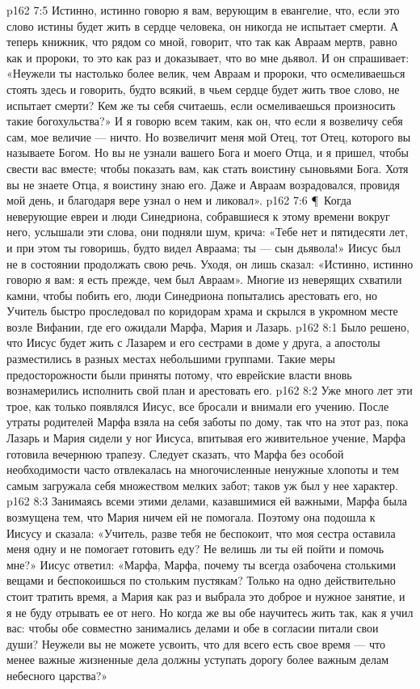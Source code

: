 \vs p162 7:5 Истинно, истинно говорю я вам, верующим в евангелие, что, если это слово истины будет жить в сердце человека, он никогда не испытает смерти. А теперь книжник, что рядом со мной, говорит, что так как Авраам мертв, равно как и пророки, то это как раз и доказывает, что во мне дьявол. И он спрашивает: «Неужели ты настолько более велик, чем Авраам и пророки, что осмеливаешься стоять здесь и говорить, будто всякий, в чьем сердце будет жить твое слово, не испытает смерти? Кем же ты себя считаешь, если осмеливаешься произносить такие богохульства?» И я говорю всем таким, как он, что если я возвеличу себя сам, мое величие --- ничто. Но возвеличит меня мой Отец, тот Отец, которого вы называете Богом. Но вы не узнали вашего Бога и моего Отца, и я пришел, чтобы свести вас вместе; чтобы показать вам, как стать воистину сыновьями Бога. Хотя вы не знаете Отца, я воистину знаю его. Даже и Авраам возрадовался, провидя мой день, и благодаря вере узнал о нем и ликовал».
\vs p162 7:6 \P\ Когда неверующие евреи и люди Синедриона, собравшиеся к этому времени вокруг него, услышали эти слова, они подняли шум, крича: «Тебе нет и пятидесяти лет, и при этом ты говоришь, будто видел Авраама; ты --- сын дьявола!» Иисус был не в состоянии продолжать свою речь. Уходя, он лишь сказал: «Истинно, истинно говорю я вам: я есть прежде, чем был Авраам». Многие из неверящих схватили камни, чтобы побить его, люди Синедриона попытались арестовать его, но Учитель быстро проследовал по коридорам храма и скрылся в укромном месте возле Вифании, где его ожидали Марфа, Мария и Лазарь.
\vs p162 8:1 Было решено, что Иисус будет жить с Лазарем и его сестрами в доме у друга, а апостолы разместились в разных местах небольшими группами. Такие меры предосторожности были приняты потому, что еврейские власти вновь вознамерились исполнить свой план и арестовать его.
\vs p162 8:2 Уже много лет эти трое, как только появлялся Иисус, все бросали и внимали его учению. После утраты родителей Марфа взяла на себя заботы по дому, так что на этот раз, пока Лазарь и Мария сидели у ног Иисуса, впитывая его живительное учение, Марфа готовила вечернюю трапезу. Следует сказать, что Марфа без особой необходимости часто отвлекалась на многочисленные ненужные хлопоты и тем самым загружала себя множеством мелких забот; таков уж был у нее характер.
\vs p162 8:3 Занимаясь всеми этими делами, казавшимися ей важными, Марфа была возмущена тем, что Мария ничем ей не помогала. Поэтому она подошла к Иисусу и сказала: «Учитель, разве тебя не беспокоит, что моя сестра оставила меня одну и не помогает готовить еду? Не велишь ли ты ей пойти и помочь мне?» Иисус ответил: «Марфа, Марфа, почему ты всегда озабочена столькими вещами и беспокоишься по стольким пустякам? Только на одно действительно стоит тратить время, а Мария как раз и выбрала это доброе и нужное занятие, и я не буду отрывать ее от него. Но когда же вы обе научитесь жить так, как я учил вас: чтобы обе совместно занимались делами и обе в согласии питали свои души? Неужели вы не можете усвоить, что для всего есть свое время --- что менее важные жизненные дела должны уступать дорогу более важным делам небесного царства?»
